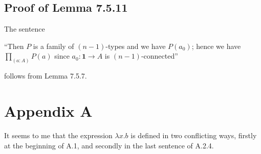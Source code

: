 \documentclass[12pt]{article}
\newcommand{\mbf}{\mathbf}
\newcommand{\nn}{\noindent}
\begin{document}

\subsection{Proof of Lemma 7.5.11}

The sentence 

\nn``Then $P$ is a family of $(n-1)$-types and we have $P(a_0)$; hence we have $\prod_{(a:A)}P(a)$ since $a_0:\mbf1\to A$ is $(n-1)$-connected''

\nn follows from Lemma 7.5.7.


\section{Appendix A}

It seems to me that the expression $\lambda x.b$ is defined in two conflicting ways, firstly at the beginning of A.1, and secondly in the last sentence of A.2.4. 
\end{document}
